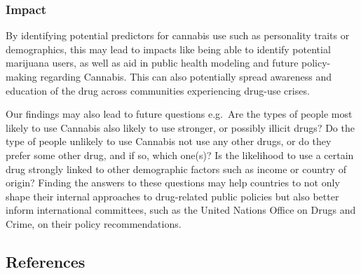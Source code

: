 \documentclass[
]{article}
\begin{document}
\hypertarget{impact}{%
\subsubsection{Impact}\label{impact}}

By identifying potential predictors for cannabis use such as personality
traits or demographics, this may lead to impacts like being able to
identify potential marijuana users, as well as aid in public health
modeling and future policy-making regarding Cannabis. This can also
potentially spread awareness and education of the drug across
communities experiencing drug-use crises.

Our findings may also lead to future questions e.g.~Are the types of
people most likely to use Cannabis also likely to use stronger, or
possibly illicit drugs? Do the type of people unlikely to use Cannabis
not use any other drugs, or do they prefer some other drug, and if so,
which one(s)? Is the likelihood to use a certain drug strongly linked to
other demographic factors such as income or country of origin? Finding
the answers to these questions may help countries to not only shape
their internal approaches to drug-related public policies but also
better inform international committees, such as the United Nations
Office on Drugs and Crime, on their policy recommendations.

\hypertarget{references}{%
\subsection{\texorpdfstring{\textbf{References}}{References}}\label{references}}
\end{document}
